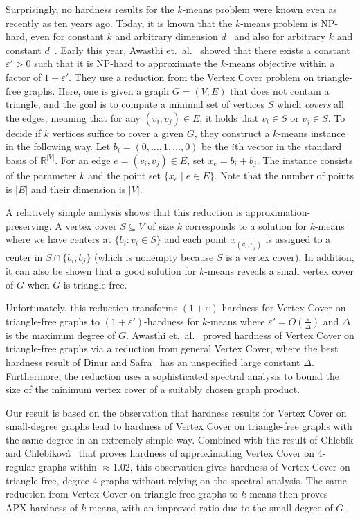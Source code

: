 \documentclass{scrartcl}
\begin{document}
Surprisingly, no hardness results for the $k$-means problem were known even as recently as ten years ago. Today, it is known that the $k$-means problem is NP-hard, even for constant $k$ and arbitrary dimension $d$~\cite{ADHP09,D08} and also for arbitrary $k$ and constant $d$~\cite{MNV09}. Early this year, Awasthi et.\ al.~\cite{ACKS15} showed that there exists a constant $\varepsilon' > 0$ such that it is NP-hard to approximate the $k$-means objective within a factor of $1+\varepsilon'$. They use a reduction from the Vertex Cover problem on triangle-free graphs.  Here, one is given a graph $G=(V,E)$ that does not contain a triangle, and the goal is to compute a minimal set of vertices $S$ which \emph{covers} all the edges, meaning that for any $(v_i, v_j) \in E$, it holds that $v_i \in S$ or $v_j \in S$.
To decide if $k$ vertices suffice to cover a given $G$, they construct a $k$-means instance in the following way. Let $b_i=(0,\ldots,1,\ldots,0)$ be the $i$th vector in the standard basis of $\mathbb{R}^{|V|}$. For an edge $e=(v_i,v_j)\in E$, set $x_e=b_i+b_j$. The instance consists of the parameter $k$ and the point set $\{x_e \mid e \in E\}$. Note that the number of points is $|E|$ and their dimension is $|V|$. 

A relatively simple analysis shows that this reduction is approximation-preserving. 
A vertex cover $S \subseteq V$ of size $k$ corresponds to a solution for $k$-means where we have centers at $\{ b_i : v_i \in S \}$ and each point $x_{(v_i, v_j)}$ is assigned to a center in $S \cap \{ b_i, b_j \}$ (which is nonempty because $S$ is a vertex cover).  In addition, it can also be shown that a good solution for $k$-means reveals a small vertex cover of $G$ when $G$ is triangle-free. 

Unfortunately, this reduction transforms $(1 + \varepsilon)$-hardness for Vertex Cover on triangle-free graphs to $(1 + \varepsilon')$-hardness for $k$-means where $\varepsilon' = O(\frac{\varepsilon}{\Delta})$ and $\Delta$ is the maximum degree of $G$.
Awasthi et.\ al.~\cite{ACKS15} proved hardness of Vertex Cover on triangle-free graphs via a reduction from general Vertex Cover, where the best hardness result of Dinur and Safra~\cite{DS05} has an unspecified large constant $\Delta$. 
Furthermore, the reduction uses a sophisticated spectral analysis to bound the size of the minimum vertex cover of a suitably chosen graph product.

Our result is based on the observation that hardness results for Vertex Cover on small-degree graphs lead to hardness of Vertex Cover on triangle-free graphs with the same degree in an extremely simple way. 
Combined with the result of Chleb\'{i}k and Chleb\'{i}kov\'{a}~\cite{CC06} that proves hardness of approximating Vertex Cover on $4$-regular graphs within $\approx 1.02$, 
this observation gives hardness of Vertex Cover on triangle-free, degree-$4$ graphs without relying on the spectral analysis. 
The same reduction from Vertex Cover on triangle-free graphs to $k$-means then proves APX-hardness of $k$-means, with an improved ratio due to the small degree of $G$. 
\end{document}
